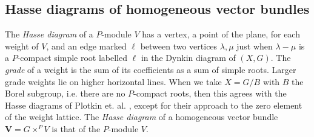 \documentclass[a4paper,10pt]{amsart}
\theoremstyle{remark}
\begin{document}
\subsection{Hasse diagrams of homogeneous vector bundles}
The \emph{Hasse diagram} of a \(P\)-module \(V\) has a vertex, a point of the plane, for each weight of \(V\), and an edge marked \(\ell\) between two vertices \(\lambda,\mu\) just when \(\lambda-\mu\) is a \(P\)-compact simple root labelled \(\ell\) in the Dynkin diagram of \((X,G)\).
The \emph{grade} of a weight is the sum of its coefficients as a sum of simple roots.
Larger grade weights lie on higher horizontal lines.
When we take \(X=G/B\) with \(B\) the Borel subgroup, i.e. there are no \(P\)-compact roots, then this agrees with the Hasse diagrams of Plotkin et. al. \cite{Plotkin/Semenov/Vavilov:1998}, except for their approach to the zero element of the weight lattice.
The \emph{Hasse diagram} of a homogeneous vector bundle \(\mathbf{V}=G\times^P V\) is that of the \(P\)-module \(V\).
\end{document}
